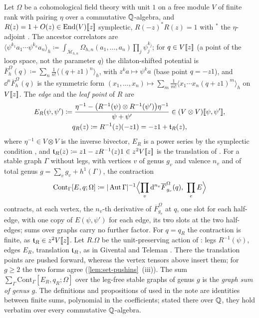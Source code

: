 \begin{defn}
\label{def:set-graphsum}
Let $\Omega$ be a cohomological field theory with unit $1$ \cite[Def.~0.3]{PPZ15} on a free module $V$ of finite rank with pairing $\eta$ over a commutative $\mathbb{Q}$-algebra, and $R(z)=1+O(z)\in\operatorname{End}(V)[\![ z ]\!]$ symplectic, $R(-z)^*R(z)=1$ with ${}^*$ the $\eta$-adjoint \cite[(5)]{PPZ15}. The ancestor correlators are $\langle\psi^{k_1}a_1\cdots\psi^{k_n}a_n\rangle_h\coloneqq\int_{\overline{\mathcal M}_{h,n}}\Omega_{h,n}(a_1,\dots,a_n)\prod_j\psi_j^{k_j}$; for $q\in V[\![ z ]\!]$ (a point of the loop space, not the parameter $q$) the dilaton-shifted potential is $\overline F^\Omega_h(q)\coloneqq\sum_n\frac1{n!}\langle(q+z1)^n\rangle_h$, with $z^ka\mapsto\psi^ka$ (base point $q=-z1$), and $\dd^n\overline F^\Omega_h(q)$ is the symmetric form $(x_1,\dots,x_n)\mapsto\sum_m\frac1{m!}\langle x_1\cdots x_n(q+z1)^m\rangle_h$ on $V[\![ z ]\!]$. The \emph{edge} and the \emph{leaf point} of $R$ are
\begin{gather*}
E_R(\psi,\psi')\coloneqq\frac{\eta^{-1}-\bigl(R^{-1}(\psi)\otimes R^{-1}(\psi')\bigr)\eta^{-1}}{\psi+\psi'}\in(V\otimes V)[\![ \psi,\psi' ]\!],\\
q_R(z)\coloneqq R^{-1}(z)(-z1)=-z1+\mathfrak{t}_R(z),
\end{gather*}
where $\eta^{-1}\in V\otimes V$ is the inverse bivector, $E_R$ is a power series by the symplectic condition \cite[Rem.~2.1, (6)]{PPZ15}, and $\mathfrak{t}_R(z)\coloneqq z1-zR^{-1}(z)1\in z^2V[\![ z ]\!]$ is the translation of \cite[Def.~2.13]{PPZ15}. For a stable graph $\Gamma$ without legs, with vertices $v$ of genus $g_v$ and valence $n_v$ and of total genus $g=\sum_vg_v+h^1(\Gamma)$, the contraction
\[
\mathrm{Cont}_\Gamma[E,q;\Omega]\coloneqq|\operatorname{Aut}\Gamma|^{-1}\Bigl\langle\prod_v\mathrm{d}^{n_v}\overline F^\Omega_{g_v}(q),\ \prod_eE\Bigr\rangle
\]
contracts, at each vertex, the $n_v$-th derivative of $\overline F^\Omega_{g_v}$ at $q$, one slot for each half-edge, with one copy of $E(\psi,\psi')$ for each edge, its two slots at the two half-edges; sums over graphs carry no further factor. For $q=q_R$ the contraction is finite, as $\mathfrak{t}_R\in z^2V[\![ z ]\!]$. Let $R.\Omega$ be the unit-preserving action of \cite[Defs.~2.2, 2.5, 2.13]{PPZ15}: legs $R^{-1}(\psi)$, edges $E_R$, translation $\mathfrak{t}_R$, as in Givental and Teleman \cite[p.~20]{PPZ15}. There the translation points are pushed forward, whereas the vertex tensors above insert them; for $g\geq2$ the two forms agree (\cref{lem:set-pushins}~(iii)). The sum $\sum_\Gamma\mathrm{Cont}_\Gamma[E_R,q_R;\Omega]$ over the leg-free stable graphs of genus $g$ is the \emph{graph sum of genus $g$}. The definitions and propositions of \cite{PPZ15} used in the note are identities between finite sums, polynomial in the coefficients; stated there over $\mathbb{Q}$, they hold verbatim over every commutative $\mathbb{Q}$-algebra.


\end{defn}
